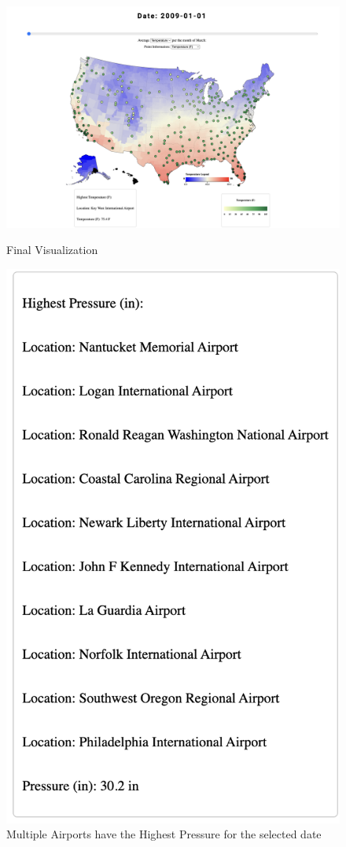 \documentclass[9pt,twocolumn,twoside]{opticajnl}
\begin{document}
\begin{figure}
    \centering
    \includegraphics[scale=0.15]{images/img7.png}
    \caption{Final Visualization}

    \includegraphics[scale=0.5]{images/img8.png}
    \caption{Multiple Airports have the Highest Pressure for the selected date}
\end{figure}
\end{document}
